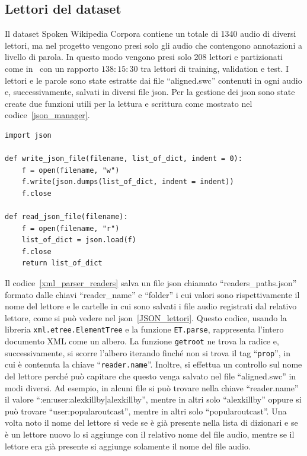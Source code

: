 \documentclass[12pt,a4paper,titlepage]{article}
\begin{document}
\subsection{Lettori del dataset}
\label{subsec:lettori}
Il dataset Spoken Wikipedia Corpora contiene un totale di 1340 audio di diversi lettori, ma nel progetto vengono presi solo gli audio che contengono annotazioni a livello di parola. In questo modo vengono presi solo 208 lettori e partizionati come in~\cite{Salamon:Few-Shot} con un rapporto $138:15:30$ tra lettori di training, validation e test. I lettori e le parole sono state estratte dai file ``aligned.swc'' contenuti in ogni audio e, successivamente, salvati in diversi file json. Per la gestione dei json sono state create due funzioni utili per la lettura e scrittura come mostrato nel codice~\ref{json_manager}.
\begin{lstlisting}[language=iPython,firstnumber=1, caption=json\_manager.py, label=json_manager,captionpos=b]
import json
	
def write_json_file(filename, list_of_dict, indent = 0):
	f = open(filename, "w")
	f.write(json.dumps(list_of_dict, indent = indent))
	f.close
	
def read_json_file(filename):
	f = open(filename, "r")
	list_of_dict = json.load(f)
	f.close
	return list_of_dict
\end{lstlisting}

Il codice~\ref{xml_parser_readers} salva un file json chiamato ``readers\_paths.json'' formato dalle chiavi ``reader\_name'' e ``folder'' i cui valori sono rispettivamente il nome del lettore e le cartelle in cui sono salvati i file audio registrati dal relativo lettore, come si può vedere nel json~\ref{JSON_lettori}. Questo codice, usando la libreria \texttt{xml.etree.ElementTree} e la funzione \texttt{ET.parse}, rappresenta l'intero documento XML come un albero. La funzione \texttt{getroot} ne trova la radice e, successivamente, si scorre l'albero iterando finché non si trova il tag ``\texttt{prop}'', in cui è contenuta la chiave ``\texttt{reader.name}''. Inoltre, si effettua un controllo sul nome del lettore perché può capitare che questo venga salvato nel file ``aligned.swc'' in modi diversi. Ad esempio, in alcuni file si può trovare nella chiave ``reader.name'' il valore ``:en:user:alexkillby|alexkillby'', mentre in altri solo ``alexkillby'' oppure si può trovare ``user:popularoutcast'', mentre in altri solo ``popularoutcast''. Una volta noto il nome del lettore si vede se è già presente nella lista di dizionari e se è un lettore nuovo lo si aggiunge con il relativo nome del file audio, mentre se il lettore era già presente si aggiunge solamente il nome del file audio.
\end{document}
